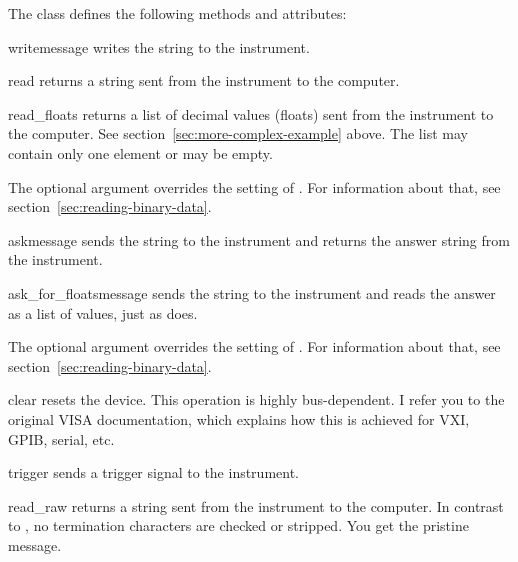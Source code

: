 \documentclass{howto}
\begin{document}
The class  defines the following methods and attributes:

\begin{methoddesc}{write}{message}
  writes the string  to the instrument.
\end{methoddesc}

\begin{methoddesc}{read}{}
  returns a string sent from the instrument to the computer.
\end{methoddesc}

\begin{methoddesc}{read_floats}{}
  returns a list of decimal values (floats) sent from the instrument to the
  computer.  See section~\ref{sec:more-complex-example} above.  The list may
  contain only one element or may be empty.

  The optional  argument overrides the setting of
  .  For information about that, see
  section~\ref{sec:reading-binary-data}.
\end{methoddesc}

\begin{methoddesc}{ask}{message}
  sends the string  to the instrument and returns the answer
  string from the instrument.
\end{methoddesc}

\begin{methoddesc}{ask_for_floats}{message}
  sends the string  to the instrument and reads the answer as a
  list of values, just as  does.

  The optional  argument overrides the setting of
  .  For information about that, see
  section~\ref{sec:reading-binary-data}.
\end{methoddesc}

\begin{methoddesc}{clear}{}
  resets the device.  This operation is highly bus-dependent.  I refer you to
  the original VISA documentation, which explains how this is achieved for VXI,
  GPIB, serial, etc.
\end{methoddesc}

\begin{methoddesc}{trigger}{}
  sends a trigger signal to the instrument.
\end{methoddesc}

\begin{methoddesc}{read_raw}{}
  returns a string sent from the instrument to the computer.  In contrast to
  , no termination characters are checked or stripped.  You get
  the pristine message.
\end{methoddesc}
\end{document}
